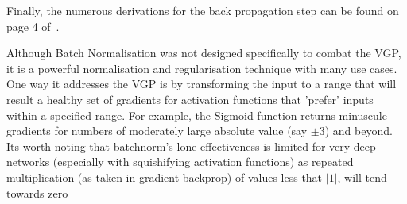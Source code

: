 {{    Finally, the numerous derivations for the back propagation step can be found on page 4 of~\citet{ioffe2015batch}.

    Although Batch Normalisation was not designed specifically to combat the VGP, it is a powerful normalisation and regularisation technique with many use cases. One way it addresses the VGP is by transforming the input to a range that will result a healthy set of gradients for activation functions that 'prefer' inputs within a specified range. For example, the Sigmoid function returns minuscule gradients for numbers of moderately large absolute value (say $\pm3$) and beyond. Its worth noting that batchnorm's lone effectiveness is limited for very deep networks (especially with squishifying activation functions) as repeated multiplication (as taken in gradient backprop) of values less that $|1|$, will tend towards zero
  }
}

